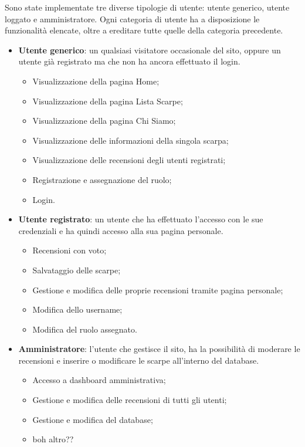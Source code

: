 \documentclass[a4paper, 12pt]{article}
\begin{document}
\begin{justify}
Sono state implementate tre diverse tipologie di utente: utente generico, utente loggato e amministratore. Ogni categoria di utente ha a disposizione le funzionalità elencate, oltre a ereditare tutte quelle della categoria precedente.
\begin{itemize}
    \item \textbf{Utente generico}: un qualsiasi visitatore occasionale del sito, oppure un utente già registrato ma che non ha ancora effettuato il login.
        \begin{itemize}
            \item Visualizzazione della pagina Home;
            \item Visualizzazione della pagina Lista Scarpe;
            \item Visualizzazione della pagina Chi Siamo;
            \item Visualizzazione delle informazioni della singola scarpa;
            \item Visualizzazione delle recensioni degli utenti registrati;
            \item Registrazione e assegnazione del ruolo;
            \item Login.
        \end{itemize}
    \item \textbf{Utente registrato}: un utente che ha effettuato l'accesso con le sue credenziali e ha quindi accesso alla sua pagina personale.
        \begin{itemize}
            \item Recensioni con voto;
            \item Salvataggio delle scarpe;
            \item Gestione e modifica delle proprie recensioni tramite pagina personale;
            \item Modifica dello username;
            \item Modifica del ruolo assegnato.
        \end{itemize}
    \item \textbf{Amministratore}: l'utente che gestisce il sito, ha la possibilità di moderare le recensioni e inserire o modificare le scarpe all'interno del database.
        \begin{itemize}
            \item Accesso a dashboard amministrativa;
            \item Gestione e modifica delle recensioni di tutti gli utenti;
            \item Gestione e modifica del database;
            \item boh altro??
        \end{itemize}
\end{itemize}



\end{justify}
\end{document}
